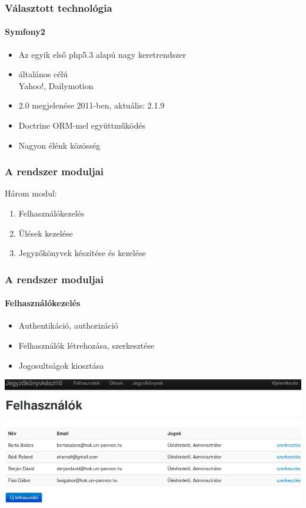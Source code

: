 \documentclass[12pt]{beamer}
\begin{document}
\begin{frame}
    \frametitle{Választott technológia}
    \framesubtitle{Symfony2}
    
    \large
    \begin{itemize}
        \item Az egyik első php5.3 alapú nagy keretrendszer
        \item általános célú\\
            \small{Yahoo!, Dailymotion}
        \large            
        \item 2.0 megjelenése 2011-ben, aktuális: 2.1.9
        \item Doctrine ORM-mel együttműködés
        \item Nagyon élénk közösség
    \end{itemize}
\end{frame}

\begin{frame}
    \frametitle{A rendszer moduljai}
    \Large
    
    Három modul:
    
    \begin{enumerate}
        \item Felhasználókezelés
        \item Ülések kezelése
        \item Jegyzőkönyvek készítése és kezelése
    \end{enumerate}
\end{frame}

\begin{frame}
    \frametitle{A rendszer moduljai}
    \framesubtitle{Felhasználókezelés}
    
    \begin{itemize}
        \item Authentikáció, authorizáció
        \item Felhasználók létrehozása, szerkesztése
        \item Jogosultságok kiosztása
    \end{itemize}
    
    \includegraphics[width=\textwidth,center]{felhasznalolista.png}   
\end{frame}
\end{document}
